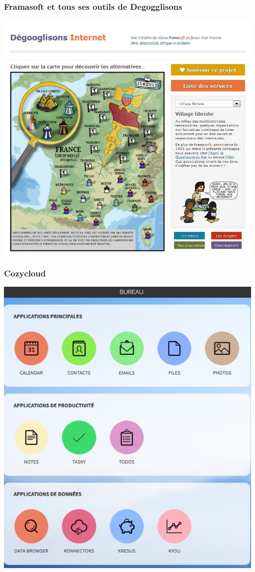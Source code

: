 \documentclass{beamer}
\begin{document}
\begin{frame}
\begin{center}
\frametitle{Framasoft et tous ses outils de Degogglisons}
\includegraphics[scale=0.6] {./images/framasoft_degogglisons.jpg}
\end{center}
\end{frame}
\begin{frame}
\begin{center}
\frametitle{Cozycloud}
\includegraphics[scale=0.6] {./images/Cozycloud.jpg}
\end{center}
\end{frame}
\end{document}
